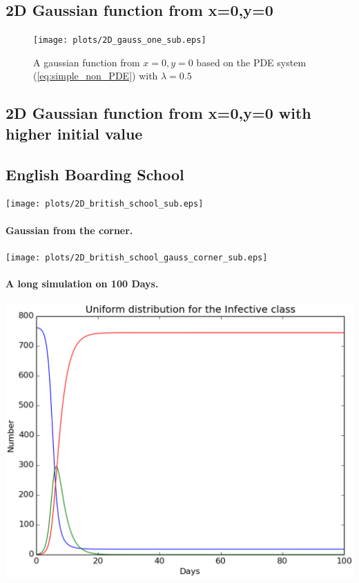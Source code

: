 \documentclass[%
twoside,                 %
final,                   %
10pt]{article}
\begin{document}
\subsection{2D Gaussian function from x=0,y=0}


\begin{figure}[ht]
  \centerline{\texttt{[image: plots/2D\_gauss\_one\_sub.eps]}}
  \caption{
  A gaussian function from $x=0,y=0$ based on the PDE system (\ref{eq:simple_non_PDE}) with $\lambda=0.5$
  }
\end{figure}


\subsection{2D Gaussian function from x=0,y=0 with higher initial value}

\subsection{English Boarding School}


\begin{center}  %
  \centerline{\texttt{[image: plots/2D\_british\_school\_sub.eps]}}
\end{center}


\paragraph{Gaussian from the corner.}
\begin{center}  %
  \centerline{\texttt{[image: plots/2D\_british\_school\_gauss\_corner\_sub.eps]}}
\end{center}


\paragraph{A long simulation on 100 Days.}
\begin{center}  %
  \centerline{\includegraphics[width=0.8\linewidth]{plots/2D_british_school_long_number.eps}}
\end{center}
\end{document}
